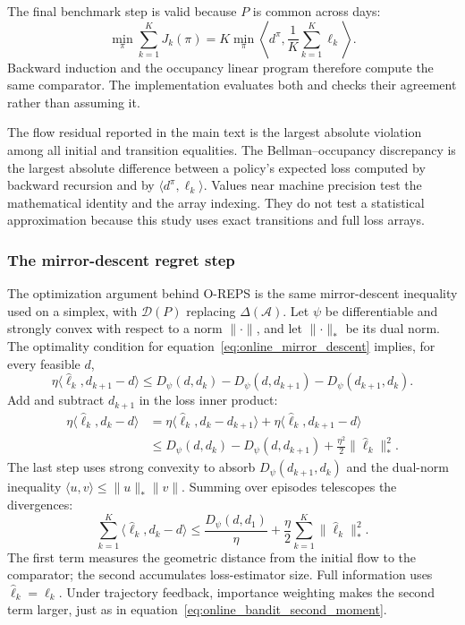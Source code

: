 The final benchmark step is valid because $P$ is common across days:
\[
\min_\pi\sum_{k=1}^KJ_k(\pi)
=
K\min_\pi\left\langle d^\pi,\frac1K\sum_{k=1}^K\ell_k\right\rangle.
\]
Backward induction and the occupancy linear program therefore compute the same comparator. The implementation evaluates both and checks their agreement rather than assuming it.

The flow residual reported in the main text is the largest absolute violation among all initial and transition equalities. The Bellman--occupancy discrepancy is the largest absolute difference between a policy's expected loss computed by backward recursion and by $\langle d^\pi,\ell_k\rangle$. Values near machine precision test the mathematical identity and the array indexing. They do not test a statistical approximation because this study uses exact transitions and full loss arrays.

\subsubsection{The mirror-descent regret step}

The optimization argument behind O-REPS is the same mirror-descent inequality used on a simplex, with $\mathcal D(P)$ replacing $\Delta(\mathcal A)$. Let $\psi$ be differentiable and strongly convex with respect to a norm $\lVert\cdot\rVert$, and let $\lVert\cdot\rVert_*$ be its dual norm. The optimality condition for equation~\eqref{eq:online_mirror_descent} implies, for every feasible $d$,
\begin{equation}
\eta\langle \widehat\ell_k,d_{k+1}-d\rangle
\leq
D_\psi(d,d_k)-D_\psi(d,d_{k+1})-D_\psi(d_{k+1},d_k).
\label{eq:online_mirror_three_point}
\end{equation}
Add and subtract $d_{k+1}$ in the loss inner product:
\begin{align}
\eta\langle\widehat\ell_k,d_k-d\rangle
&=
\eta\langle\widehat\ell_k,d_k-d_{k+1}\rangle
+\eta\langle\widehat\ell_k,d_{k+1}-d\rangle \nonumber\\
&\leq
D_\psi(d,d_k)-D_\psi(d,d_{k+1})
+\frac{\eta^2}{2}\lVert\widehat\ell_k\rVert_*^2.
\label{eq:online_mirror_one_step_bound}
\end{align}
The last step uses strong convexity to absorb $D_\psi(d_{k+1},d_k)$ and the dual-norm inequality $\langle u,v\rangle\leq\lVert u\rVert_*\lVert v\rVert$. Summing over episodes telescopes the divergences:
\begin{equation}
\sum_{k=1}^K\langle\widehat\ell_k,d_k-d\rangle
\leq
\frac{D_\psi(d,d_1)}{\eta}
+\frac{\eta}{2}\sum_{k=1}^K\lVert\widehat\ell_k\rVert_*^2.
\label{eq:online_mirror_generic_regret}
\end{equation}
The first term measures the geometric distance from the initial flow to the comparator; the second accumulates loss-estimator size. Full information uses $\widehat\ell_k=\ell_k$. Under trajectory feedback, importance weighting makes the second term larger, just as in equation~\eqref{eq:online_bandit_second_moment}.


